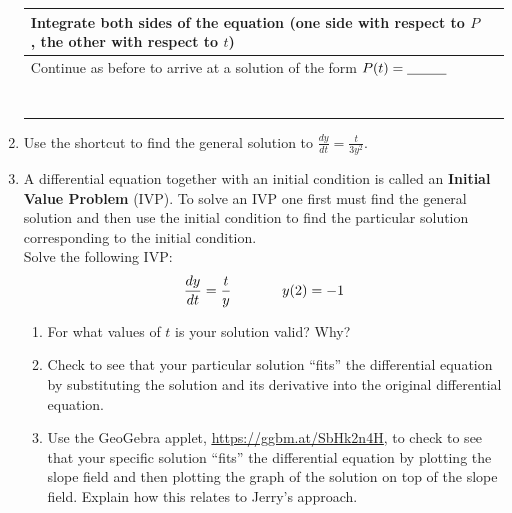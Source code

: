 \begin{enumerate}[resume]
\begin{center}
\begin{tabular}{|p{2.5in}|V|}
Integrate both sides of the equation (one side with respect to $P$, the other with respect to $t$)	  &
{} \\\hline

Continue as before to arrive at a solution of the form $P(t)=\underline{\hskip1cm}$	 	  &
{} \\
{} & {} \\
{} & {} \\
{} & {} \\
{} & {} \\
{} & {} \\
{} & {} \\
{} & {} \\ \hline
\end{tabular}
\end{center}

\item	Use the shortcut to find the general solution to  $\displaystyle \frac{dy}{dt}=\frac{t}{3y^2}$. \label{03problem5}
\vfill

\clearpage

\item	A differential equation together with an initial condition is called an \textbf{Initial Value Problem} (IVP). To solve an IVP one first must find the general solution and then use the initial condition to find the particular solution corresponding to the initial condition. \label{03problem6} \\ Solve the following IVP:    
\[ \frac{dy}{dt}=\frac{t}{y}\hspace{0.5in} y(2)=-1\]
\vfill

\begin{enumerate}
\item	 For what values of $t$ is your solution valid? Why? \label{03problem6parta} 
\vskip1cm

\item Check to see that your {particular} solution ``fits'' the differential equation by substituting the solution and its derivative into the original differential equation. \label{03problem6partb} 
\vfill

\item	Use the GeoGebra applet, \href{https://ggbm.at/SbHk2n4H}{\underline{https://ggbm.at/SbHk2n4H}}, to check to see that your specific solution ``fits'' the differential equation by plotting the slope field and then plotting the graph of the solution on top of the slope field. Explain how this relates to Jerry's approach. \label{03problem6partc}


\end{enumerate}
\end{enumerate}
